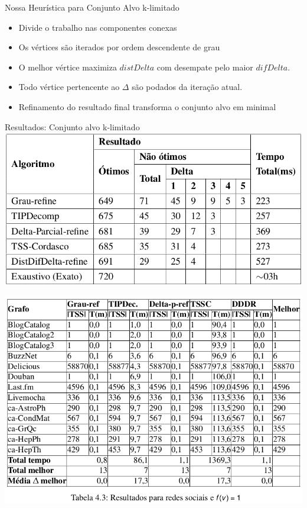\documentclass{beamer}
\begin{document}
\begin{frame}{Nossa Heurística para Conjunto Alvo k-limitado}
\begin{itemize}
\tightlist
\item
  Divide o trabalho nas componentes conexas
\item
  Os vértices são iterados por ordem descendente de grau
\item
  O melhor vértice maximiza \(distDelta\) com desempate pelo maior
  \(difDelta\).
\item
  Todo vértice pertencente ao \(\Delta\) são podados da iteração atual.
\item
  Refinamento do resultado final transforma o conjunto alvo em minimal
\end{itemize}

\end{frame}

\begin{frame}{Resultados: Conjunto alvo k-limitado}
\protect\hypertarget{resultados-conjunto-alvo-k-limitado}{}
\includegraphics[scale=0.3]{img/alg-distdif-exato.png}
\end{frame}

\begin{frame}
\includegraphics[scale=0.3]{img/k1.png} 
\end{frame}
\end{document}
